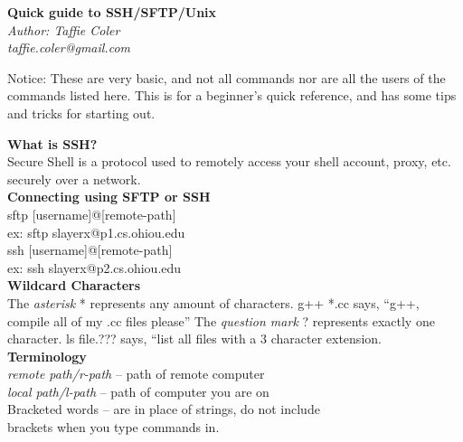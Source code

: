 \documentclass[a4paper]{article}
\begin{document}
 \begin{landscape}
 \setlength\columnsep{5pt}
 \begin{multicols}{3}

\begin{center}
	{\large \textbf{Quick guide to SSH/SFTP/Unix}}\\
	\textit{Author: Taffie Coler}\\
	\textit{taffie.coler@gmail.com}\\
\end{center}

Notice: These are very basic, and not all commands nor are all the users of the commands listed here. This is for a beginner's quick reference, and has some tips and tricks for starting out.

\vspace{2mm}
\textbf{What is SSH?}\\
Secure Shell is a protocol used to remotely access your
shell account, proxy, etc. securely over a network.\\

\vspace{2mm}
\textbf{Connecting using SFTP or SSH}\\
sftp [username]@[remote-path]\\
ex: sftp slayerx@p1.cs.ohiou.edu\\
ssh [username]@[remote-path]\\
ex: ssh slayerx@p2.cs.ohiou.edu\\

\vspace{2mm}
\textbf{Wildcard Characters}\\
The \textit{asterisk} * represents any amount of characters.
g++ *.cc says, “g++, compile all of my .cc files please”
The \textit{question mark} ? represents exactly one character.
ls file.??? says, “list all files with a 3 character extension.\\

\vspace{2mm}
\textbf{Terminology}\\
\textit{remote path/r-path} – path of remote computer\\
\textit{local path/l-path} – path of computer you are on\\
Bracketed words – are in place of strings, do not include\\
brackets when you type commands in.\\


\end{multicols}
\end{landscape}
\end{document}
